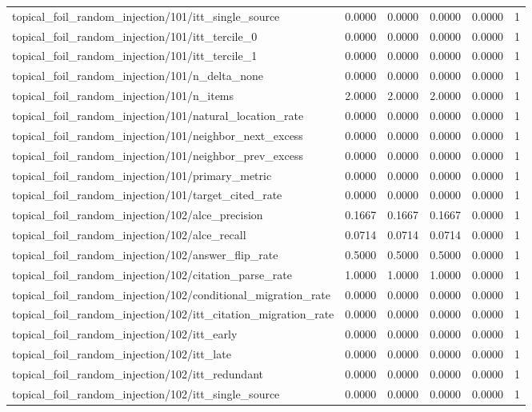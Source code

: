 \begin{table}[h]
\begin{tabular}{lrrrrr}
topical_foil_random_injection/101/itt_single_source & 0.0000 & 0.0000 & 0.0000 & 0.0000 & 1 \\
topical_foil_random_injection/101/itt_tercile_0 & 0.0000 & 0.0000 & 0.0000 & 0.0000 & 1 \\
topical_foil_random_injection/101/itt_tercile_1 & 0.0000 & 0.0000 & 0.0000 & 0.0000 & 1 \\
topical_foil_random_injection/101/n_delta_none & 0.0000 & 0.0000 & 0.0000 & 0.0000 & 1 \\
topical_foil_random_injection/101/n_items & 2.0000 & 2.0000 & 2.0000 & 0.0000 & 1 \\
topical_foil_random_injection/101/natural_location_rate & 0.0000 & 0.0000 & 0.0000 & 0.0000 & 1 \\
topical_foil_random_injection/101/neighbor_next_excess & 0.0000 & 0.0000 & 0.0000 & 0.0000 & 1 \\
topical_foil_random_injection/101/neighbor_prev_excess & 0.0000 & 0.0000 & 0.0000 & 0.0000 & 1 \\
topical_foil_random_injection/101/primary_metric & 0.0000 & 0.0000 & 0.0000 & 0.0000 & 1 \\
topical_foil_random_injection/101/target_cited_rate & 0.0000 & 0.0000 & 0.0000 & 0.0000 & 1 \\
topical_foil_random_injection/102/alce_precision & 0.1667 & 0.1667 & 0.1667 & 0.0000 & 1 \\
topical_foil_random_injection/102/alce_recall & 0.0714 & 0.0714 & 0.0714 & 0.0000 & 1 \\
topical_foil_random_injection/102/answer_flip_rate & 0.5000 & 0.5000 & 0.5000 & 0.0000 & 1 \\
topical_foil_random_injection/102/citation_parse_rate & 1.0000 & 1.0000 & 1.0000 & 0.0000 & 1 \\
topical_foil_random_injection/102/conditional_migration_rate & 0.0000 & 0.0000 & 0.0000 & 0.0000 & 1 \\
topical_foil_random_injection/102/itt_citation_migration_rate & 0.0000 & 0.0000 & 0.0000 & 0.0000 & 1 \\
topical_foil_random_injection/102/itt_early & 0.0000 & 0.0000 & 0.0000 & 0.0000 & 1 \\
topical_foil_random_injection/102/itt_late & 0.0000 & 0.0000 & 0.0000 & 0.0000 & 1 \\
topical_foil_random_injection/102/itt_redundant & 0.0000 & 0.0000 & 0.0000 & 0.0000 & 1 \\
topical_foil_random_injection/102/itt_single_source & 0.0000 & 0.0000 & 0.0000 & 0.0000 & 1 \\

\end{tabular}
\end{table}
